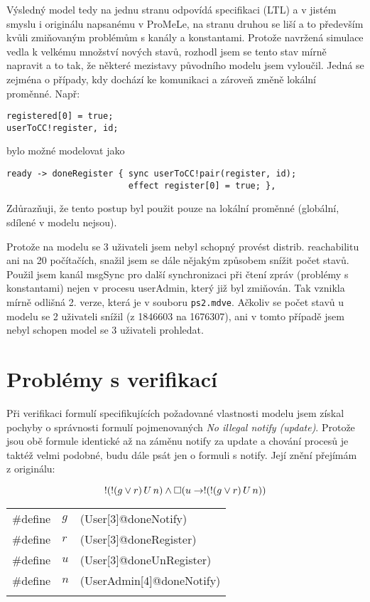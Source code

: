 \documentclass[a4paper]{article}
\begin{document}
Výsledný model tedy na jednu stranu odpovídá specifikaci (LTL) a v jistém smyslu i originálu napsanému v ProMeLe, na stranu druhou se liší
a to především kvůli zmiňovaným problémům s kanály a konstantami. Protože navržená simulace vedla k velkému množství nových stavů, rozhodl
jsem se tento stav mírně napravit a to tak, že některé mezistavy původního modelu jsem vyloučil. Jedná se zejména o případy, kdy dochází
ke komunikaci a zároveň změně lokální proměnné. Např:
\begin{verbatim}
registered[0] = true;
userToCC!register, id;
\end{verbatim}
bylo možné modelovat jako
\begin{verbatim}
ready -> doneRegister { sync userToCC!pair(register, id);
                        effect register[0] = true; },
\end{verbatim}
Zdůrazňuji, že tento postup byl použit pouze na lokální proměnné (globální, sdílené v modelu nejsou).

Protože na modelu se 3 uživateli jsem nebyl schopný provést distrib. reachabilitu ani na 20 počítačích, snažil jsem se dále nějakým způsobem
snížit počet stavů. Použil jsem kanál msgSync pro další synchronizaci při čtení zpráv (problémy s konstantami) nejen v procesu userAdmin, 
který již byl zmiňován. Tak vznikla mírně odlišná 2. verze, která je v souboru \texttt{ps2.mdve}. Ačkoliv se počet stavů u modelu se 2
uživateli snížil (z 1846603 na 1676307), ani v tomto případě jsem nebyl schopen model se 3 uživateli prohledat.

\section{Problémy s verifikací}
Při verifikaci formulí specifikujících požadované vlastnosti modelu jsem získal pochyby o správnosti formulí pojmenovaných
\emph{No illegal notify (update)}. Protože jsou obě formule identické až na záměnu notify za update a chování procesů je taktéž velmi podobné,
budu dále psát jen o formuli s notify. Její znění přejímám z originálu:

\[
!(!(g \vee r)\,U\,n)\wedge \Box(u \rightarrow !(!(g\vee r)\,U\,n))\\
\]
\begin{tabular}[h]{lll}
\#define & $g$ & (User[3]@doneNotify) \\ 
\#define & $r$ & (User[3]@doneRegister) \\ 
\#define & $u$ & (User[3]@doneUnRegister) \\ 
\#define & $n$ & (UserAdmin[4]@doneNotify) \\
\vspace*{3mm}
\end{tabular}
\end{document}
